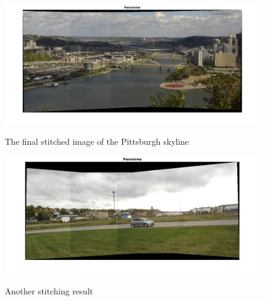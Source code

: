 \documentclass{article}
\begin{document}
\begin{figure}[H]
\centering
\includegraphics[scale=0.4]{pitt_panorama.jpg}
\label{fig_pittPanorama}
\caption{The final stitched image of the Pittsburgh skyline}
\end{figure}

\begin{figure}[H]
\centering
\includegraphics[scale=0.4]{car_panorama.jpg}
\label{fig_carPanorama}
\caption{Another stitching result}
\end{figure}
\end{document}
